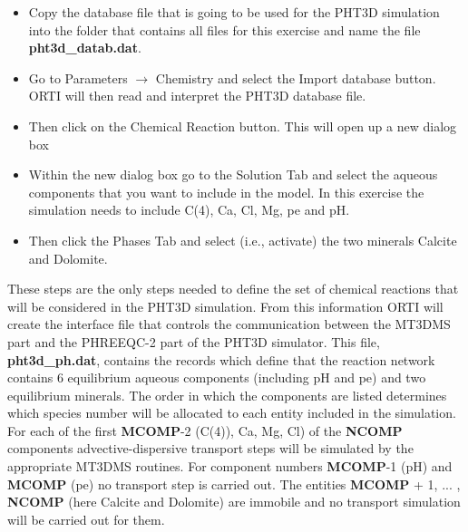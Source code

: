 \begin{itemize}

\item Copy the database file that is going to be used for the PHT3D simulation
into the folder that contains all files for this exercise and name the file {\color{red} \textbf{pht3d\_datab.dat}}.

\item Go to {\color{blue}Parameters} $\rightarrow$ {\color{blue}Chemistry} and select the
{\color{blue}Import database} button. ORTI will then read and interpret 
the PHT3D database file.

\item Then click on the {\color{blue}Chemical Reaction} button. This will open up a new dialog box

\item Within the new dialog box go to the {\color{blue}Solution} Tab and 
select the aqueous components that you want to 
include in the model. 
In this exercise the simulation needs to include C(4), Ca, Cl, Mg, pe and pH.

\item Then click the {\color{blue}Phases} Tab and select (i.e., activate) the two 
minerals Calcite and Dolomite.

\end{itemize}

These steps are the only steps needed to define the set of chemical reactions 
that will be considered in the PHT3D simulation. 
From this information ORTI will create the interface file that controls the communication
between the MT3DMS part and the PHREEQC-2 part of the PHT3D simulator. 
This file, {\color{red} \textbf{pht3d\_ph.dat}}, contains the records which define that the 
reaction network contains 6 equilibrium aqueous components 
(including pH and pe) and two equilibrium minerals. 
The order in which the components are listed determines which species number will 
be allocated to each entity included in the simulation. 
For each of the first {\color{red} \textbf{MCOMP}}-2 (C(4)), Ca, Mg, Cl) 
of the {\color{red} \textbf{NCOMP}} components advective-dispersive transport steps will 
be simulated by the appropriate MT3DMS routines. 
For component numbers {\color{red} \textbf{MCOMP}}-1 (pH) and 
{\color{red} \textbf{MCOMP}} (pe) no transport step is carried out. 
The entities {\color{red} \textbf{MCOMP}} + 1, ... ,{\color{red} \textbf{NCOMP}} (here Calcite
and Dolomite) are immobile and no transport simulation will be carried out for them.

